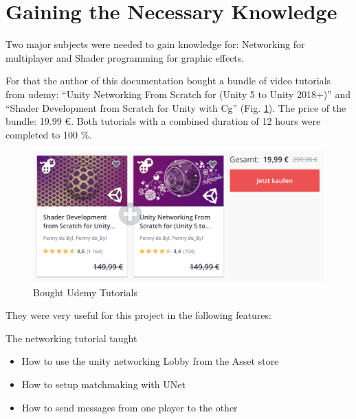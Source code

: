 \section{Gaining the Necessary Knowledge }


Two major subjects were needed to gain knowledge for: Networking for multiplayer and Shader programming for graphic effects.

For that the author of this documentation bought a bundle of video tutorials from udemy: ``Unity Networking From Scratch for (Unity 5 to Unity 2018+)'' and ``Shader Development from Scratch for Unity with Cg'' (Fig. \ref{fig:Tutorials}). The price of the bundle: 19.99 €. Both tutorials with a combined duration of 12 hours were completed to 100 \%.

\begin{figure}[htbp]
	\centering
		\includegraphics[width=1.00\textwidth]{img/Tutorials.png}
	\caption[Bought Udemy Tutorials]{Bought Udemy Tutorials}
	\label{fig:Tutorials}
\end{figure}

They were very useful for this project in the following features:

The networking tutorial taught
\begin{itemize}
	\item How to use the unity networking Lobby from the Asset store
	\item How to setup matchmaking with UNet
	\item How to send messages from one player to the other
\end{itemize}

